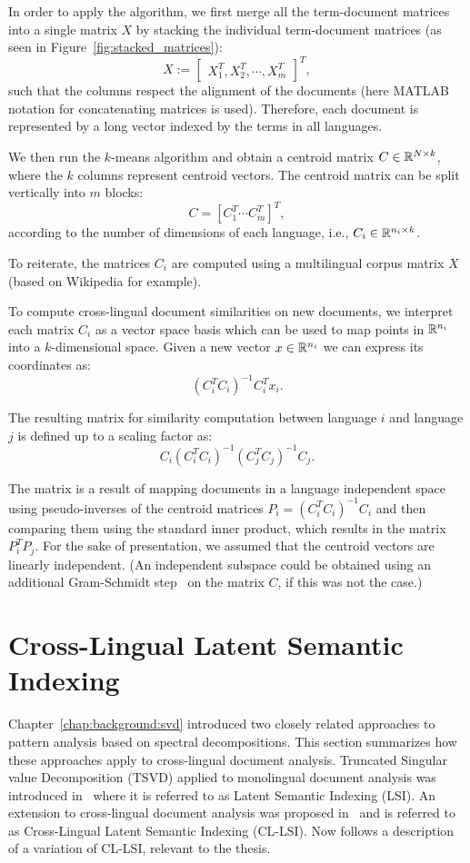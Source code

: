 In order to apply the algorithm, we first merge all the term-document matrices into a single matrix
$X$ by stacking the individual term-document matrices (as seen in Figure~\ref{fig:stacked_matrices}):
$$X := \begin{bmatrix}X_1^T ,X_2^T, \cdots, X_m^T \end{bmatrix}^T,$$
such that the columns respect the alignment of the documents (here MATLAB notation for concatenating
matrices is used). Therefore, each document is represented by a long vector indexed by the terms in all languages.

We then run the $k$-means algorithm and obtain a centroid matrix $C \in \mathbb{R}^{N \times k}$,
where the $k$ columns represent centroid vectors. The centroid matrix can be split vertically into $m$
blocks: $$C = [C_1^T \cdots C_m^T]^T,$$ according to the number of dimensions of each language,
i.e., $C_i \in \mathbb{R}^{n_i \times k}$.

To reiterate, the matrices $C_i$ are computed using a multilingual corpus
matrix $X$ (based on Wikipedia for example).

To compute  cross-lingual document similarities on new documents, we interpret each matrix $C_i$
as a vector space basis which can be used to map points in $\mathbb{R}^{n_i}$ into a $k$-dimensional space. Given
a new vector $x \in \mathbb{R}^{n_i}$ we can express its coordinates as:
$$(C_i^T C_i)^{-1} C_i^T x_i.$$

The resulting matrix for similarity computation between language $i$ and language $j$
is defined up to a scaling factor as:
$$C_i(C_i^T C_i)^{-1} (C_j^T C_j)^{-1} C_j.$$

The matrix is a result of mapping documents in a language independent space using
pseudo-inverses of the centroid matrices $P_i = (C_i^T C_i)^{-1} C_i$ and then
comparing them using the standard inner product, which results in the matrix
$P_i^T P_j$. For the sake of presentation, we assumed that the centroid vectors
are linearly independent. (An independent subspace could be obtained using an
additional Gram-Schmidt step~\cite{golub} on the matrix $C$, if this was not the case.)

\section{Cross-Lingual Latent Semantic Indexing}\label{chap:crosslingual:LSI}

Chapter~\ref{chap:background:svd} introduced two closely related approaches
to pattern analysis based on spectral decompositions. This section summarizes
how these approaches apply to cross-lingual document analysis. Truncated Singular
value Decomposition (TSVD) applied to monolingual document analysis was introduced
in~\cite{lsi} where it is referred to as Latent Semantic Indexing (LSI). An extension
to cross-lingual document analysis was proposed in~\cite{cl_lsi} and is referred to as
Cross-Lingual Latent Semantic Indexing (CL-LSI). Now follows a description of a
variation of CL-LSI, relevant to the thesis.

